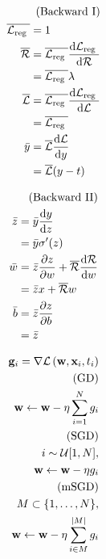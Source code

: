 \documentclass[4pt]{article}
\begin{document}
	\begin{minipage}[t]{.15\linewidth}
	\begin{align*}
		\text{{(Backward I)}} \\
		\begin{aligned} \overline{\mathcal{L}_{\text {reg }}} &=1 \\ \overline{\mathcal{R}} &=\overline{\mathcal{L}_{\text {reg }}} \frac{\mathrm{d} \mathcal{L}_{\text {reg }}}{\mathrm{d} \mathcal{R}} \\ &=\overline{\mathcal{L}_{\text {reg }}} \lambda \\ \overline{\mathcal{L}} &=\overline{\mathcal{L}_{\text {reg }}} \frac{\mathrm{d} \mathcal{L}_{\text {reg }}}{\mathrm{d} \mathcal{L}} \\ &=\overline{\mathcal{L}_{\text {reg }}} \\ \bar{y} &=\overline{\mathcal{L}} \frac{\mathrm{d} \mathcal{L}}{\mathrm{d} y} \\ &=\overline{\mathcal{L}}(y-t)
		\end{aligned}
	\end{align*}
	\end{minipage}
	\begin{minipage}[t]{0.15\linewidth}
		\begin{align*}
			\text{{(Backward II)}} \\
			\begin{aligned} \bar{z} &=\bar{y} \frac{\mathrm{d} y}{\mathrm{d} z} \\ &=\bar{y} \sigma^{\prime}(z) \\ \bar{w} &=\bar{z} \frac{\partial z}{\partial w}+\overline{\mathcal{R}} \frac{\mathrm{d} \mathcal{R}}{\mathrm{d} w} \\ &=\bar{z} x+\overline{\mathcal{R}} w \\ \bar{b} &=\bar{z} \frac{\partial z}{\partial b} \\ &=\bar{z} \end{aligned}
		\end{align*}
	\end{minipage}
	\vline
	\begin{minipage}[t]{0.15\linewidth}
		\begin{align*}
			\mathbf{g}_{i}=\nabla \mathcal{L}\left(\mathbf{w}, \mathbf{x}_{i}, t_{i}\right) \\
			\text{{(GD)}} \\
			\mathbf{w} \leftarrow \mathbf{w}-\eta \sum_{i=1}^{N} g_{i} \\
			\text{{(SGD)}} \\
			i \sim \mathcal{U}[1, N], \\
			\mathbf{w} \leftarrow \mathbf{w}-\eta g_{i} \\
			\text{{(mSGD)}} \\
			M \subset\{1, \ldots, N\}, \\
			\mathbf{w} \leftarrow \mathbf{w}-\eta \sum_{i \in M}^{|M|} g_{i}
		\end{align*}
	\end{minipage}
\end{document}
